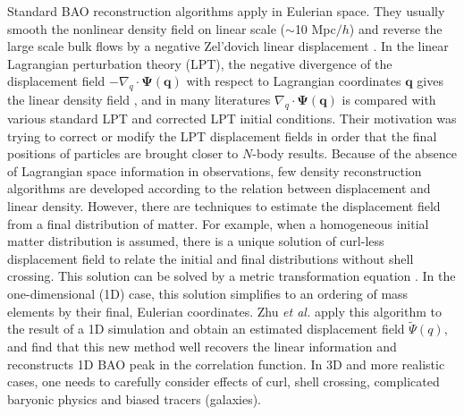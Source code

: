 \documentclass[aps,prd,twocolumn,superscriptaddress,amsfont,amssymb,amsmath,nofootinbib,showpacs,balancelastpage]{revtex4-1}
\newcommand{\bs}{\boldsymbol}
\begin{document}
Standard BAO reconstruction algorithms apply in Eulerian space.
They usually smooth the nonlinear density field on
linear scale ($\sim$10 Mpc$/h$) and reverse the large 
scale bulk flows by a negative Zel'dovich linear displacement
\citep{2007ApJ...664..675E,2009PhRvD..80l3501N,2009PhRvD..79f3523P}.
In the linear Lagrangian perturbation theory (LPT), the 
negative divergence of the displacement field
$-\nabla_q\cdot\bs\Psi(\bs q)$ with respect to Lagrangian coordinates $\bs q$
gives the linear density field \citep{2010PhDT.........4J},
and in many literatures
\cite{2013MNRAS.428..141N,2014PhRvD..89h3515C,2016JCAP...03..017B}
$\nabla_q\cdot\bs\Psi(\bs q)$ is compared with various standard LPT
and corrected LPT initial conditions. Their motivation was
trying to correct or modify the LPT displacement fields
in order that the final positions of particles are brought
closer to $N$-body results. Because of the absence
of Lagrangian space information in observations, few density
reconstruction algorithms are developed according to the relation
between displacement and linear density. However,
there are techniques to estimate the displacement field from a final 
distribution of matter.
For example, when a homogeneous initial matter distribution 
is assumed, there is a unique solution of curl-less displacement field to relate 
the initial and final distributions without shell crossing. This solution can be 
solved by a metric transformation equation
\citep{1995ApJS..100..269P,1998ApJS..115...19P}.
In the one-dimensional (1D) case, this solution 
simplifies to an ordering of mass elements by their final, Eulerian coordinates.
Zhu {\it et al.} \cite{2016arXiv160907041Z} apply this algorithm to the result
of a 1D simulation \citep{2016JCAP...01..043M} and obtain an estimated
displacement field $\tilde\Psi(q)$, and find
that this new method well recovers the linear
information and reconstructs 1D BAO peak in the correlation function.
In 3D and more realistic cases, one needs to
carefully consider effects of curl, shell crossing, 
complicated baryonic physics and biased tracers (galaxies).
\end{document}
